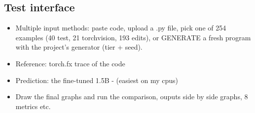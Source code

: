 \documentclass[twoside,english]{article}
\begin{document}
\subsection{Test interface}
\begin{itemize}
	\item Multiple input methods: paste code, upload a .py file, pick one of 254 examples (40 test, 21 torchvision, 193
    edits), or GENERATE a fresh program with the project's generator (tier + seed).
	\item Reference: torch.fx trace of the code
	\item Prediction: the fine-tuned 1.5B - (easiest on my cpus)
	\item Draw the final graphs and run the comparison, ouputs side by side graphs, 8 metrics etc.
\end{itemize}
\end{document}
